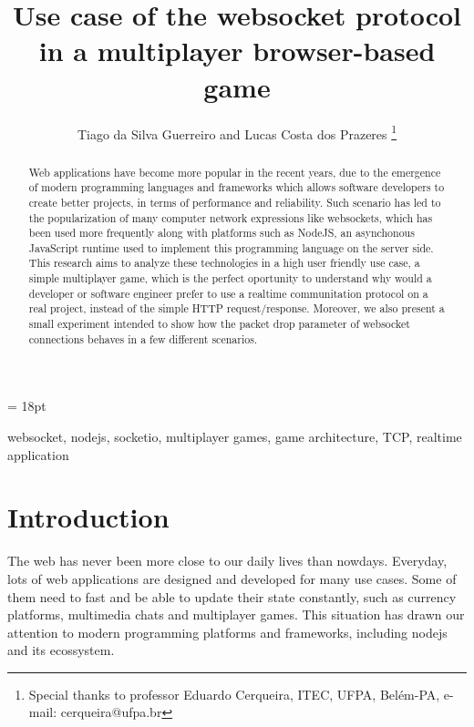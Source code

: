 \documentclass[english]{sbrt}
\begin{document}
\title{Use case of the websocket protocol in a multiplayer browser-based game}

\author{Tiago da Silva Guerreiro and Lucas Costa dos Prazeres
  \thanks{Special thanks to professor Eduardo Cerqueira, ITEC, UFPA, Belém-PA, e-mail: cerqueira@ufpa.br}
}

\maketitle

\baselineskip = 18pt


\begin{abstract}
  Web applications have become more popular in the recent years, due to the emergence of modern programming languages and frameworks which allows software developers to create better projects, in terms of performance and reliability.
Such scenario has led to the popularization of many computer network expressions like websockets, which has been used more frequently along with platforms such as NodeJS, an asynchonous JavaScript runtime used to implement this programming language
on the server side. This research aims to analyze these technologies in a high user friendly use case, a simple multiplayer game, which is the perfect oportunity to understand why would a developer or software engineer prefer to use a realtime communitation
protocol on a real project, instead of the simple HTTP request/response. Moreover, we also present a small experiment intended to show how the packet drop parameter of websocket connections behaves in a few different scenarios.

\end{abstract}
\begin{keywords}
  websocket, nodejs, socketio, multiplayer games, game architecture, TCP, realtime application
\end{keywords}

\section{\textbf{Introduction}}

The web has never been more close to our daily lives than nowdays. Everyday, lots of web applications are designed and developed for
many use cases. Some of them need to fast and be able to update their state constantly, such as currency platforms, multimedia chats and multiplayer games.
This situation has drawn our attention to modern programming platforms and frameworks, including nodejs and its ecossystem.
\end{document}
